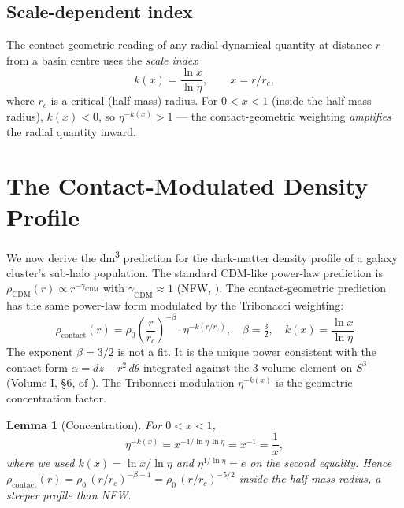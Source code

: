 \documentclass[11pt,a4paper]{article}
\newtheorem{lemma}[theorem]{Lemma}
\theoremstyle{definition}
\theoremstyle{remark}
\begin{document}
\subsection{Scale-dependent index}

The contact-geometric reading of any radial dynamical quantity at distance $r$ from a basin centre uses the \emph{scale index}
\begin{equation}
k(x) = \frac{\ln x}{\ln \eta}, \qquad x = r / r_c,
\label{eq:scaleindex}
\end{equation}
where $r_c$ is a critical (half-mass) radius. For $0 < x < 1$ (inside the half-mass radius), $k(x) < 0$, so $\eta^{-k(x)} > 1$ --- the contact-geometric weighting \emph{amplifies} the radial quantity inward.

\section{The Contact-Modulated Density Profile}
\label{sec:profile}

We now derive the dm\textsuperscript{3} prediction for the dark-matter density profile of a galaxy cluster's sub-halo population. The standard CDM-like power-law prediction is $\rho_{\mathrm{CDM}}(r) \propto r^{-\gamma_{\mathrm{CDM}}}$ with $\gamma_{\mathrm{CDM}} \approx 1$ (NFW, \citealt{NFW1997}). The contact-geometric prediction has the same power-law form modulated by the Tribonacci weighting:
\begin{equation}
\boxed{\;\rho_{\mathrm{contact}}(r) = \rho_0 \left(\frac{r}{r_c}\right)^{-\beta} \cdot \eta^{-k(r/r_c)}, \quad \beta = \tfrac{3}{2}, \quad k(x) = \frac{\ln x}{\ln \eta}\;}
\label{eq:profile}
\end{equation}
The exponent $\beta = 3/2$ is not a fit. It is the unique power consistent with the contact form $\alpha = dz - r^2\,d\theta$ integrated against the 3-volume element on $S^3$ (Volume I, §6, of \citealt{principia2026}). The Tribonacci modulation $\eta^{-k(x)}$ is the geometric concentration factor.

\begin{lemma}[Concentration]
\label{lem:concentration}
For $0 < x < 1$,
\begin{equation}
\eta^{-k(x)} = x^{-1/\ln\eta\,\ln\eta} = x^{-1} = \frac{1}{x},
\end{equation}
where we used $k(x) = \ln x / \ln\eta$ and $\eta^{1/\ln\eta} = e$ on the second equality. Hence $\rho_{\mathrm{contact}}(r) = \rho_0\,(r/r_c)^{-\beta - 1} = \rho_0\,(r/r_c)^{-5/2}$ inside the half-mass radius, a steeper profile than NFW.
\end{lemma}
\end{document}
